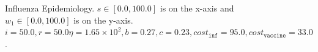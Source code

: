 \begin{figure}[h!]
    \centering
    \caption{Influenza Epidemiology. $ s \in \left[ 0.0, 100.0 \right]$ is on the x-axis and $ w_1 \in \left[ 0.0, 100.0 \right]$ is on the y-axis. $ i = 50.0, r = 50.0 \eta = 1.65 \times 10^2, b = 0.27, c = 0.23, cost_{\mathtt{inf}} = 95.0, cost_{\mathtt{vaccine}} = 33.0$.}
    \label{fig:robot1d}
\end{figure}

